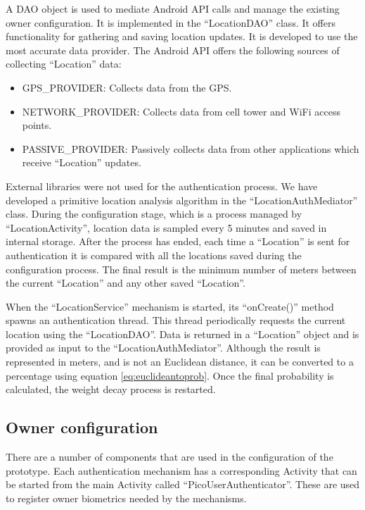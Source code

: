 A DAO object is used to mediate Android API calls and manage the existing owner configuration. It is implemented in the ``LocationDAO'' class. It offers functionality for gathering and saving location updates. It is developed to use the most accurate data provider. The Android API offers the following sources of collecting ``Location'' data:
\begin{itemize}
	\item GPS\_PROVIDER: Collects data from the GPS.
	\item NETWORK\_PROVIDER: Collects data from cell tower and WiFi access points.
	\item PASSIVE\_PROVIDER: Passively collects data from other applications which receive ``Location'' updates.
\end{itemize}

External libraries were not used for the authentication process. We have developed a primitive location analysis algorithm in the ``LocationAuthMediator'' class. During the configuration stage, which is a process managed by ``LocationActivity'', location data is sampled every 5 minutes and saved in internal storage. After the process has ended, each time a ``Location'' is sent for authentication it is compared with all the locations saved during the configuration process. The final result is the minimum number of meters between the current ``Location'' and any other saved ``Location''.

When the ``LocationService'' mechanism is started, its ``onCreate()'' method spawns an authentication thread. This thread periodically requests the current location using the ``LocationDAO''. Data is returned in a ``Location'' object and is provided as input to the ``LocationAuthMediator''. Although the result is represented in meters, and is not an Euclidean distance, it can be converted to a percentage using equation \ref{eq:euclideantoprob}. Once the final probability is calculated, the weight decay process is restarted.

\subsection{Owner configuration}
There are a number of components that are used in the configuration of the prototype. Each authentication mechanism has a corresponding Activity that can be started from the main Activity called ``PicoUserAuthenticator''. These are used to register owner biometrics needed by the mechanisms.


